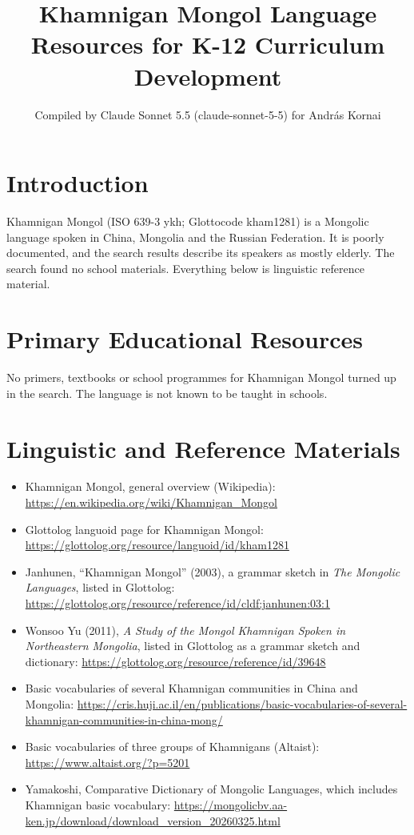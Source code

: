 \documentclass[12pt]{article}
\title{Khamnigan Mongol Language Resources for K-12 Curriculum Development}
\author{Compiled by Claude Sonnet 5.5 (claude-sonnet-5-5) for Andr\'as Kornai}
\date{}
\begin{document}
\maketitle

\section{Introduction}
Khamnigan Mongol (ISO 639-3 ykh; Glottocode kham1281) is a Mongolic language spoken in China, Mongolia and the Russian Federation. It is poorly documented, and the search results describe its speakers as mostly elderly. The search found no school materials. Everything below is linguistic reference material.

\section{Primary Educational Resources}
No primers, textbooks or school programmes for Khamnigan Mongol turned up in the search. The language is not known to be taught in schools.

\section{Linguistic and Reference Materials}
\begin{itemize}
\item Khamnigan Mongol, general overview (Wikipedia): \url{https://en.wikipedia.org/wiki/Khamnigan_Mongol}
\item Glottolog languoid page for Khamnigan Mongol: \url{https://glottolog.org/resource/languoid/id/kham1281}
\item Janhunen, ``Khamnigan Mongol'' (2003), a grammar sketch in \emph{The Mongolic Languages}, listed in Glottolog: \url{https://glottolog.org/resource/reference/id/cldf:janhunen:03:1}
\item Wonsoo Yu (2011), \emph{A Study of the Mongol Khamnigan Spoken in Northeastern Mongolia}, listed in Glottolog as a grammar sketch and dictionary: \url{https://glottolog.org/resource/reference/id/39648}
\item Basic vocabularies of several Khamnigan communities in China and Mongolia: \url{https://cris.huji.ac.il/en/publications/basic-vocabularies-of-several-khamnigan-communities-in-china-mong/}
\item Basic vocabularies of three groups of Khamnigans (Altaist): \url{https://www.altaist.org/?p=5201}
\item Yamakoshi, Comparative Dictionary of Mongolic Languages, which includes Khamnigan basic vocabulary: \url{https://mongolicbv.aa-ken.jp/download/download_version_20260325.html}
\end{itemize}
\end{document}
